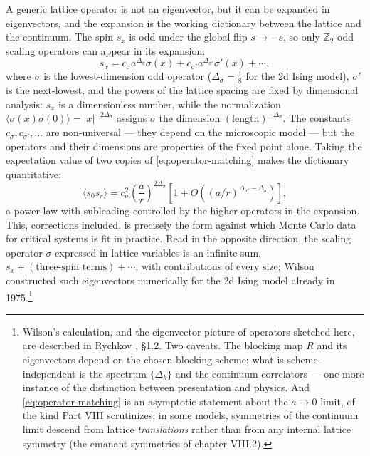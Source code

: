 A generic lattice operator is not an eigenvector, but it can be expanded in
eigenvectors, and the expansion is the working dictionary between the lattice
and the continuum. The spin $s_x$ is odd under the global flip $s \to -s$, so
only $\mathbb{Z}_2$-odd scaling operators can appear in its expansion:
\begin{equation}
s_x = c_\sigma a^{\Delta_\sigma} \sigma(x)
+ c_{\sigma'} a^{\Delta_{\sigma'}} \sigma'(x) + \cdots ,
\label{eq:operator-matching}
\end{equation}
where $\sigma$ is the lowest-dimension odd operator ($\Delta_\sigma =
\tfrac18$ for the 2d Ising model), $\sigma'$ is the next-lowest, and the
powers of the lattice spacing are fixed by dimensional analysis: $s_x$ is a
dimensionless number, while the normalization
$\langle\sigma(x)\sigma(0)\rangle = |x|^{-2\Delta_\sigma}$ assigns $\sigma$
the dimension $(\text{length})^{-\Delta_\sigma}$. The constants $c_\sigma,
c_{\sigma'}, \dots$ are non-universal --- they depend on the microscopic
model --- but the operators and their dimensions are properties of the fixed
point alone. Taking the expectation value of two copies of
\eqref{eq:operator-matching} makes the dictionary quantitative:
\begin{equation}
\langle s_0 s_r\rangle =
c_\sigma^2 \left(\frac{a}{r}\right)^{2\Delta_\sigma}
\left[ 1 + O\left((a/r)^{\Delta_{\sigma'} - \Delta_\sigma}\right) \right],
\label{eq:corrections-to-scaling}
\end{equation}
a power law with subleading  controlled by the
higher operators in the expansion. This, corrections included, is precisely
the form against which Monte Carlo data for critical systems is fit in
practice. Read in the opposite direction, the scaling operator $\sigma$
expressed in lattice variables is an infinite sum, $s_x + (\text{three-spin
terms}) + \cdots$, with contributions of every size; Wilson constructed such
eigenvectors numerically for the 2d Ising model already in
1975.\footnote{Wilson's calculation, and the eigenvector picture of operators
sketched here, are described in Rychkov , \S1.2. Two
caveats. The blocking map $R$ and its eigenvectors depend on the chosen
blocking scheme; what is scheme-independent is the spectrum $\{\Delta_k\}$
and the continuum correlators --- one more instance of the distinction
between presentation and physics. And \eqref{eq:operator-matching} is an
asymptotic statement about the $a \to 0$ limit, of the kind Part VIII
scrutinizes; in some models, symmetries of the continuum limit descend from
lattice \emph{translations} rather than from any internal lattice symmetry
(the emanant symmetries of chapter VIII.2).}

